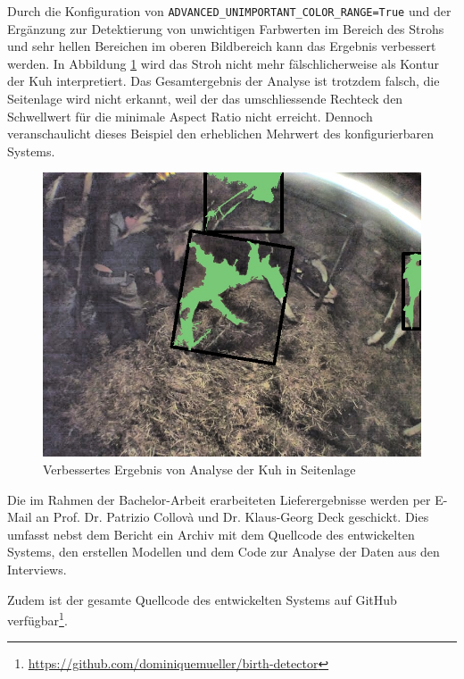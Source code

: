 Durch die Konfiguration von \texttt{ADVANCED_UNIMPORTANT_COLOR_RANGE=True} und der Ergänzung zur Detektierung von unwichtigen Farbwerten im Bereich des Strohs und sehr hellen Bereichen im oberen Bildbereich kann das Ergebnis verbessert werden. In Abbildung \ref{fig: Verbessertes Ergebnis von Analyse der Kuh in Seitenlage} wird das Stroh nicht mehr fälschlicherweise als Kontur der Kuh interpretiert. Das Gesamtergebnis der Analyse ist trotzdem falsch, die Seitenlage wird nicht erkannt, weil der das umschliessende Rechteck den Schwellwert für die minimale Aspect Ratio nicht erreicht. Dennoch veranschaulicht dieses Beispiel den erheblichen Mehrwert des konfigurierbaren Systems.

\begin{figure}[H]
	\center
	\includegraphics[scale=0.5]{Grafiken/resultate/verbessertesResultat.jpg}
	\caption{Verbessertes Ergebnis von Analyse der Kuh in Seitenlage} 
	\label{fig: Verbessertes Ergebnis von Analyse der Kuh in Seitenlage} 
\end{figure}


Die im Rahmen der Bachelor-Arbeit erarbeiteten Lieferergebnisse werden per E-Mail an Prof. Dr. Patrizio Collovà und Dr. Klaus-Georg Deck geschickt. Dies umfasst nebst dem Bericht ein Archiv mit dem Quellcode des entwickelten Systems, den erstellen Modellen und dem Code zur Analyse der Daten aus den Interviews. 

Zudem ist der gesamte Quellcode des entwickelten Systems auf GitHub verfügbar\footnote{\url{https://github.com/dominiquemueller/birth-detector}}. 